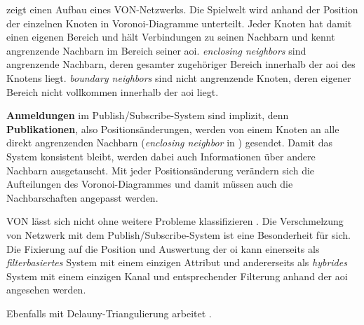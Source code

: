  zeigt einen Aufbau eines VON-Netzwerks. Die Spielwelt wird anhand der Position der einzelnen Knoten in Voronoi-Diagramme unterteilt. Jeder Knoten hat damit einen eigenen Bereich und hält Verbindungen zu seinen Nachbarn und kennt angrenzende Nachbarn im Bereich seiner \ac{aoi}. \emph{enclosing neighbors} sind angrenzende Nachbarn, deren gesamter zugehöriger Bereich innerhalb der \ac{aoi} des Knotens liegt. \emph{boundary neighbors} sind nicht angrenzende Knoten, deren eigener Bereich nicht vollkommen innerhalb der \ac{aoi} liegt.

\textbf{Anmeldungen} im Publish/Subscribe-System sind implizit, denn \textbf{Publikationen}, also Positionsänderungen, werden von einem Knoten an alle direkt angrenzenden Nachbarn (\emph{enclosing neighbor} in ) gesendet. Damit das System konsistent bleibt, werden dabei auch Informationen über andere Nachbarn ausgetauscht. Mit jeder Positionsänderung verändern sich die Aufteilungen des Voronoi-Diagrammes und damit müssen auch die Nachbarschaften angepasst werden.

VON lässt sich nicht ohne weitere Probleme klassifizieren . Die Verschmelzung von Netzwerk mit dem Publish/Subscribe-System ist eine Besonderheit für sich. Die Fixierung auf die Position und Auswertung der \ac{oi} kann einerseits als \emph{filterbasiertes} System mit einem einzigen Attribut und andererseits als \emph{hybrides} System mit einem einzigen Kanal und entsprechender Filterung anhand der \ac{aoi}  angesehen werden.


Ebenfalls mit Delauny-Triangulierung arbeitet \cite{Liebeherr2002Applicationlayer}.

